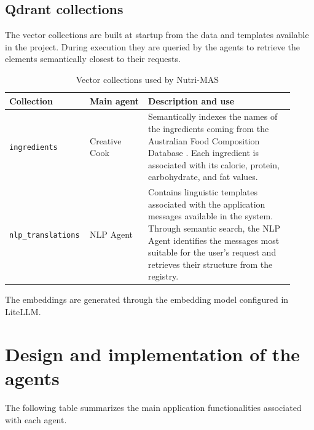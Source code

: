 \documentclass[12pt,a4paper]{article}
\newcommand{\toprule}{\hline}
\newcommand{\midrule}{\hline}
\newcommand{\bottomrule}{\hline}
\begin{document}
\subsection{Qdrant collections}

The vector collections are built at startup from the data and
templates available in the project. During execution they are queried by the
agents to retrieve the elements semantically closest to their requests.

\begin{table}[H]
\centering
\small
\setlength{\tabcolsep}{5pt}
\begin{tabular}{@{}p{0.22\linewidth}p{0.20\linewidth}p{0.50\linewidth}@{}}
\toprule
Collection & Main agent & Description and use \\
\midrule

\texttt{ingredients}
& Creative Cook
& Semantically indexes the names of the ingredients coming
from the Australian Food Composition Database \cite{FSANZAFCDRelease3}. Each ingredient is associated with
its calorie, protein, carbohydrate, and fat values. \\

\texttt{nlp\_translations}
 & NLP Agent
 & Contains linguistic templates associated with the application messages available in the
 system. Through semantic search, the NLP Agent identifies the messages most
 suitable for the user's request and retrieves their structure from the registry. \\

\bottomrule
\end{tabular}
\caption{Vector collections used by Nutri-MAS}
\end{table}
The embeddings are generated through the embedding model configured in LiteLLM.

\section{Design and implementation of the agents}
\sloppy

The following table summarizes the main application functionalities associated with each agent.
\end{document}
